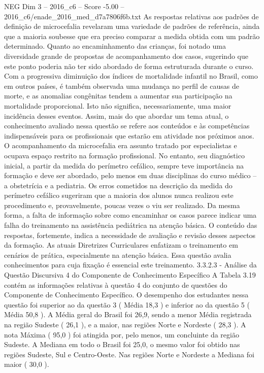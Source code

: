 \begin{textsample}{NEG Dim 3 – 2016\_c6 – Score -5.00 – 2016\_c6/enade\_2016\_med\_d7a7806f6b.txt}
As respostas relativas aos padrões de definição de microcefalia revelaram uma variedade de padrões de referência, ainda que a maioria soubesse que era preciso comparar a medida obtida com um padrão determinado.
Quanto ao encaminhamento das crianças, foi notado uma diversidade grande de propostas de acompanhamento dos casos, sugerindo que este ponto poderia não ter sido abordado de forma estruturada durante o curso.
Com a progressiva diminuição dos índices de mortalidade infantil no Brasil, como em outros países, é também observada uma mudança no perfil de causas de morte, e as anomalias congênitas tendem a aumentar sua participação na mortalidade proporcional.
Isto não significa, necessariamente, uma maior incidência desses eventos.
Assim, mais do que abordar um tema atual, o conhecimento avaliado nessa questão se refere aos conteúdos e às competências indispensáveis para os profissionais que estarão em atividade nos próximos anos.
O acompanhamento da microcefalia era assunto tratado por especialistas e ocupava espaço restrito na formação profissional.
No entanto, seu diagnóstico inicial, a partir da medida do perímetro cefálico, sempre teve importância na formação e deve ser abordado, pelo menos em duas disciplinas do curso médico – a obstetrícia e a pediatria.
Os erros cometidos na descrição da medida do perímetro cefálico sugeriram que a maioria dos alunos nunca realizou este procedimento e, provavelmente, poucas vezes o viu ser realizado.
Da mesma forma, a falta de informação sobre como encaminhar os casos parece indicar uma falha do treinamento na assistência pediátrica na atenção básica.
O conteúdo das respostas, fortemente, indica a necessidade de avaliação e revisão desses aspectos da formação.
As atuais Diretrizes Curriculares enfatizam o treinamento em cenários de prática, especialmente na atenção básica.
Essa questão avalia conhecimentos para cuja fixação é essencial este treinamento. 3.3.2.3 - Análise da Questão Discursiva 4 do Componente de Conhecimento Específico A Tabela 3.19 contém as informações relativas à questão 4 do conjunto de questões do Componente de Conhecimento Específico.
O desempenho dos estudantes nessa questão foi superior ao da questão 3 ( Média 18,3 ) e inferior ao da questão 5 ( Média 50,8 ).
A Média geral do Brasil foi 26,9, sendo a menor Média registrada na região Sudeste ( 26,1 ), e a maior, nas regiões Norte e Nordeste ( 28,3 ).
A nota Máxima ( 95,0 ) foi atingida por, pelo menos, um concluinte da região Sudeste.
A Mediana em todo o Brasil foi 25,0, o mesmo valor foi obtido nas regiões Sudeste, Sul e Centro-Oeste.
Nas regiões Norte e Nordeste a Mediana foi maior ( 30,0 ).

\end{textsample}
